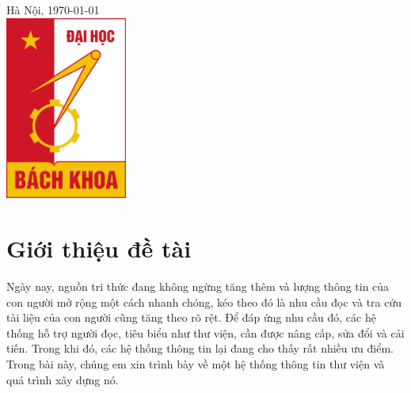 \documentclass[12pt]{report}
\begin{document}
\begin{titlepage}
{\large Hà Nội, \today}\\[1cm] %

\includegraphics[width=4cm]{hust.jpg}\\[1cm] %
 

\vfill %

\end{titlepage}

\tableofcontents 
\newpage

\newpage
\setcounter{page}{1}

\section{Giới thiệu đề tài}
Ngày nay, nguồn tri thức đang không ngừng tăng thêm và lượng thông tin của con người mở rộng một cách nhanh chóng, 
kéo theo đó là nhu cầu đọc và tra cứu tài liệu của con người cũng tăng theo rõ rệt. 
Để đáp ứng nhu cầu đó, các hệ thống hỗ trợ người đọc, tiêu biểu như thư viện, cần được nâng cấp, 
sửa đổi và cải tiến. Trong khi đó, các hệ thống thông tin lại đang cho thấy rất nhiều ưu điểm. 
Trong bài này, chúng em xin trình bày về một hệ thống thông tin thư viện và quá trình xây dựng nó.
\end{document}
